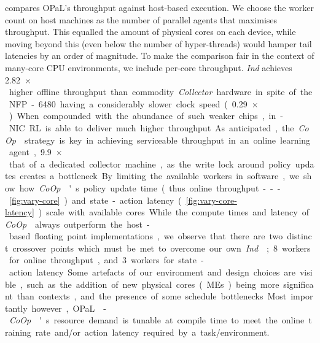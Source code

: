 \documentclass[sigconf,natbib=false]{acmart}
\newcommand{\approachshort}{OPaL}
\newcommand{\Coopfw}{\emph{CoOp}}
\newcommand{\Indfw}{\emph{Ind}}
\begin{document}
\begin{table}
	\caption{Action and update throughputs for \approachshort{} versus commodity hardware hosts. Most designs cannot scale online performance with additional cores. Higher is better, with the best marked \emph{in bold}.\label{tab:tputs}}
\end{table}

 compares \approachshort{}'s throughput against host-based execution.
We choose the worker count on host machines as the number of parallel agents that maximises throughput.
This equalled the amount of physical cores on each device, while moving beyond this (even below the number of hyper-threads) would hamper tail latencies by an order of magnitude.
To make the comparison fair in the context of many-core CPU environments, we include per-core throughput.
\Indfw{} achieves \SI{2.82}{$\times$} higher offline throughput than commodity \emph{Collector} hardware in spite of the NFP-6480 having a considerably slower clock speed (\SI{0.29}{$\times$}).
When compounded with the abundance of such weaker chips, in-NIC RL is able to deliver much higher throughput.
As anticipated, the \Coopfw{} strategy is key in achieving serviceable throughput in an online learning agent, \SI{9.9}{$\times$} that of a dedicated collector machine, as the write lock around policy updates creates a bottleneck.

By limiting the available workers in software, we show how \Coopfw{}'s policy update time (thus  online throughput---\cref{fig:vary-core}) and state-action latency (\cref{fig:vary-core-latency}) scale with available cores.
While the compute times and latency of \Coopfw{} always outperform the host-based floating point implementations, we observe that there are two distinct crossover points which must be met to overcome our own \Indfw{}; \num{8} workers for online throughput, and \num{3} workers for state-action latency.
Some artefacts of our environment and design choices are visible, such as the addition of new physical cores (MEs) being more significant than contexts, and the presence of some schedule bottlenecks.
Most importantly however, \approachshort{}-\Coopfw{}'s resource demand is tunable at compile time to meet the online training rate and/or action latency required by a task/environment.
\end{document}
